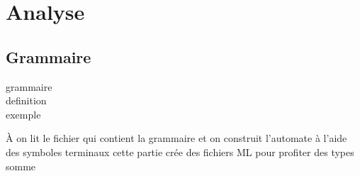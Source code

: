 \section{Analyse}

\subsection{Grammaire}
\begin{frame}
    grammaire\\
    definition \\
    exemple
\end{frame}


\begin{frame}
    À on lit le fichier qui contient la grammaire et on construit l'automate à l'aide des symboles terminaux
    cette partie crée des fichiers ML pour profiter des types somme
\end{frame}
